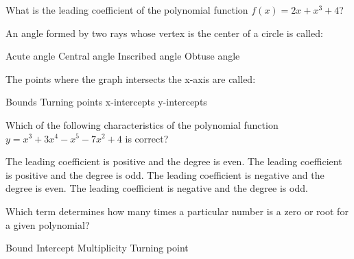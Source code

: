 \begin{questions}

\question What is the leading coefficient of the polynomial function $f(x) = 2x + x^3 + 4$?

\begin{multicols}{4}
\begin{choices} 
\end{choices}
\end{multicols}

\question An angle formed by two rays whose vertex is the center of a circle is called: 

\begin{multicols}{4}
\begin{choices}  
\choice Acute angle
\CorrectChoice Central angle
\choice Inscribed angle
\choice  Obtuse angle
\end{choices}
\end{multicols}

\question The points where the graph intersects the x-axis are called: 
\begin{multicols}{4}
\begin{choices}  
\choice Bounds
\choice Turning points
\CorrectChoice x-intercepts
\choice  y-intercepts 
\end{choices}
\end{multicols}

\question Which of the following characteristics of the polynomial function $y = x^3 + 3x^4 - x^5 - 7x^2 + 4$ is correct? 
\begin{choices}  
\choice The leading coefficient is positive and the degree is even. 
\choice The leading coefficient is positive and the degree is odd.
\choice The leading coefficient is negative and the degree is even.
\CorrectChoice   The leading coefficient is negative and the degree is odd.
\end{choices}

\question Which term determines how many times a particular number is a zero or root for a given polynomial? 

\begin{multicols}{4}
\begin{choices}  
\choice Bound
\choice Intercept
\CorrectChoice Multiplicity
\choice  Turning point
\end{choices}
\end{multicols} 


\end{questions}
